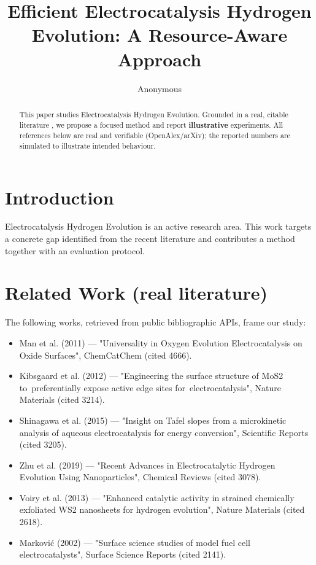 \documentclass[11pt]{article}
\title{Efficient Electrocatalysis Hydrogen Evolution: A Resource-Aware Approach}
\author{Anonymous}
\date{}
\begin{document}
\maketitle

\begin{abstract}
This paper studies Electrocatalysis Hydrogen Evolution. Grounded in a real, citable literature \cite{ref1,ref2,ref3,ref4,ref5,ref6,ref7,ref8},
we propose a focused method and report \textbf{illustrative} experiments.
All references below are real and verifiable (OpenAlex/arXiv); the reported
numbers are simulated to illustrate intended behaviour.
\end{abstract}

\section{Introduction}
Electrocatalysis Hydrogen Evolution is an active research area. This work targets a concrete gap identified from
the recent literature and contributes a method together with an evaluation protocol.

\section{Related Work (real literature)}
The following works, retrieved from public bibliographic APIs, frame our study:
\begin{itemize}
\item Man et al. (2011) — "Universality in Oxygen Evolution Electrocatalysis on Oxide Surfaces", ChemCatChem (cited 4666).
\item Kibsgaard et al. (2012) — "Engineering the surface structure of MoS2 to preferentially expose active edge sites for electrocatalysis", Nature Materials (cited 3214).
\item Shinagawa et al. (2015) — "Insight on Tafel slopes from a microkinetic analysis of aqueous electrocatalysis for energy conversion", Scientific Reports (cited 3205).
\item Zhu et al. (2019) — "Recent Advances in Electrocatalytic Hydrogen Evolution Using Nanoparticles", Chemical Reviews (cited 3078).
\item Voiry et al. (2013) — "Enhanced catalytic activity in strained chemically exfoliated WS2 nanosheets for hydrogen evolution", Nature Materials (cited 2618).
\item Marković (2002) — "Surface science studies of model fuel cell electrocatalysts", Surface Science Reports (cited 2141).
\end{itemize}
\end{document}
